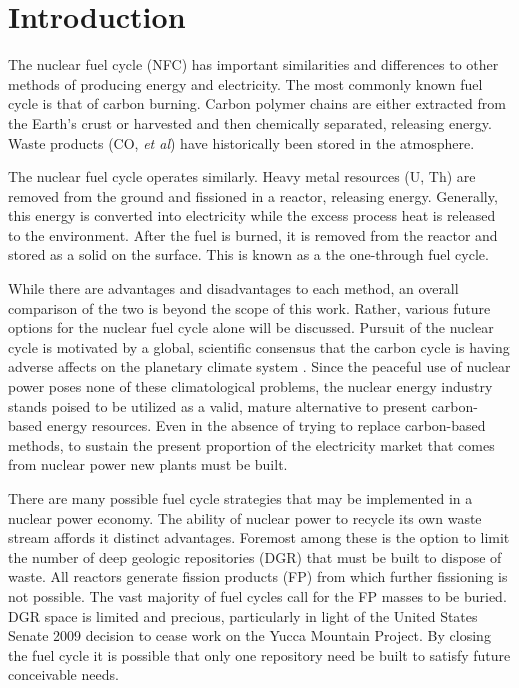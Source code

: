 \chapter{Introduction}
\label{diss_intro}

The nuclear fuel cycle (NFC) has important similarities and differences to other
methods of producing energy and electricity.  The most commonly known 
fuel cycle is that of carbon burning.  Carbon polymer chains
are either extracted from the Earth's crust or harvested and then chemically separated,
releasing energy.  Waste products (CO, \emph{et al}) have historically been 
stored in the atmosphere.

The nuclear fuel cycle operates similarly.  Heavy metal resources (U, Th) are removed from the ground
and fissioned in a reactor, releasing energy.  Generally, this energy is converted 
into electricity while the excess process heat is released to the environment.  
After the fuel is burned, it is removed from the reactor and stored as a solid on the surface.
This is known as a the one-through fuel cycle.

While there are advantages and disadvantages to each method, an overall comparison of the two is beyond the scope
of this work.  Rather, various future options for the nuclear fuel cycle alone will be discussed.  
Pursuit of the nuclear cycle is motivated by a global, scientific consensus that the carbon cycle 
is having adverse affects on the planetary climate system \cite{climatechangewater}.  
Since the peaceful use of nuclear power 
poses none of these climatological problems, the nuclear energy industry stands poised to be utilized 
as a valid, mature alternative to present carbon-based energy resources.
Even in the absence of trying to replace carbon-based methods, 
to sustain the present proportion of the electricity market that comes from 
nuclear power new plants must be built.

There are many possible fuel cycle strategies that may be implemented in a nuclear power economy.
The ability of nuclear power to recycle its own waste stream affords it distinct advantages.  
Foremost among these is the option to limit the number of deep geologic repositories (DGR) 
that must be built to dispose of waste.   All reactors generate fission products (FP) from 
which further fissioning is not possible.  The vast majority of fuel cycles call for the FP masses 
to be buried.  DGR space is limited and precious, particularly in light of the United States Senate 2009
decision to cease work on the Yucca Mountain Project.  
By closing the fuel cycle it is possible  that only one repository need be built to satisfy 
future conceivable needs.

